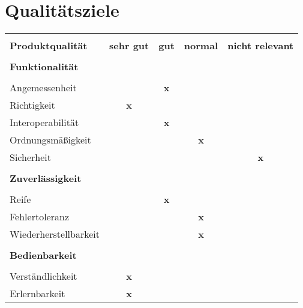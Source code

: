 \section{Qualitätsziele}

\begin{table}[H]
\centering

\label{tabelle_qualitaetsziele}
\begin{tabular}{|lcccc|}
\hline 
\rowcolor[HTML]{E80F9C} %
&&&& \\[-0.4cm]
\rowcolor[HTML]{E80F9C}
\textbf{Produktqualität}       & \textbf{sehr gut} & \textbf{gut} & \textbf{normal} & \textbf{nicht relevant} \\[0.1cm]
\hline 
&&&& \\[-0.4cm] 
\textbf{Funktionalität} &&&&   								    		  \\[0.1cm] \hline &&&& \\[-0.4cm]
Angemessenheit        &          & \textbf{x}   &        &                \\[0.1cm]
Richtigkeit           & \textbf{x}        &     &        &                \\[0.1cm]
Interoperabilität     &          & \textbf{x}   &        &                \\[0.1cm]
Ordnungsmäßigkeit     &          &     & \textbf{x}      &                \\[0.1cm]
Sicherheit            &          &     &        & \textbf{x}              \\[0.1cm] \hline &&&& \\[-0.4cm]
\textbf{Zuverlässigkeit} &&&&       							 		  \\[0.1cm] \hline &&&& \\[-0.4cm]
Reife                 &          & \textbf{x}   &        &                \\[0.1cm]
Fehlertoleranz        &          &     & \textbf{x}      &                \\[0.1cm]
Wiederherstellbarkeit &          &     & \textbf{x}      &                \\[0.1cm] \hline &&&& \\[-0.4cm]
\textbf{Bedienbarkeit}&&&&								         		  \\[0.1cm] \hline &&&& \\[-0.4cm]
Verständlichkeit      & \textbf{x}        &     &        &                \\[0.1cm]
Erlernbarkeit         & \textbf{x}        &     &        &                \\[0.1cm]

\end{tabular}
\end{table}

